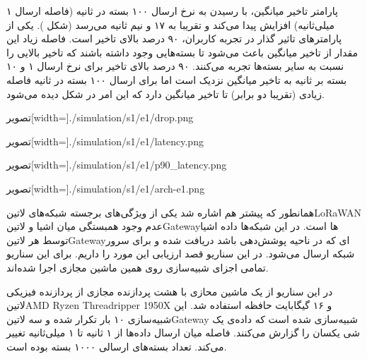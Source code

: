 پارامتر تاخیر میانگین، با رسیدن به نرخ ارسال ۱۰۰ بسته در ثانیه (فاصله ارسال ۱ میلی‌ثانیه) افزایش پیدا می‌کند و
تقریبا به ۱۷ و نیم ثانیه می‌رسد (شکل ).
یکی از پارامترهای تاثیر گذار در تجربه کاربران، ۹۰ درصد بالای تاخیر است.
فاصله زیاد این مقدار از تاخیر میانگین باعث می‌شود تا بسته‌هایی وجود داشته باشند که تاخیر بالایی را نسبت به سایر بسته‌ها تجربه می‌کنند.
۹۰ درصد بالای تاخیر برای نرخ ارسال ۱ و ۱۰ بسته بر ثانیه به تاخیر میانگین نزدیک است اما برای ارسال ۱۰۰ بسته در ثانیه فاصله زیادی (تقریبا دو برابر) تا تاخیر میانگین دارد که این امر
در شکل  دیده می‌شود.

‌تصویر[width=\textwidth]{./simulation/s1/e1/drop.png}

‌تصویر[width=\textwidth]{./simulation/s1/e1/latency.png}

‌تصویر[width=\textwidth]{./simulation/s1/e1/p90_latency.png}

‌تصویر[width=\textwidth]{./simulation/s1/e1/arch-e1.png}


همانطور که پیشتر هم اشاره شد یکی از ویژگی‌های برجسته شبکه‌های ‌لاتین{LoRaWAN} عدم وجود
همبستگی میان اشیا و ‌لاتین{Gateway}ها است. در این شبکه‌ها داده اشیا توسط هر ‌لاتین{Gateway}ای
که در ناحیه پوشش‌دهی باشد دریافت شده و برای سرور شبکه ارسال می‌شود.
در این سناریو قصد ارزیابی این مورد را داریم.
برای این سناریو تمامی اجزای شبیه‌سازی روی همین ماشین مجازی اجرا شده‌اند.

در این سناریو از یک ماشین محازی با هشت پردازنده مجازی از پردازنده فیزیکی
‌لاتین{AMD Ryzen Threadripper 1950X}
و ۱۶ گیگابایت حافظه استفاده شد.
این شبیه‌سازی ۱۰ بار تکرار شده
و سه ‌لاتین{Gateway} شبیه‌سازی شده است که داده‌ی یک شی یکسان را گزارش می‌کنند. فاصله میان ارسال داده‌ها از ۱ ثانیه تا ۱ میلی‌ثانیه تغییر می‌کند.
تعداد بسته‌های ارسالی ۱۰۰۰ بسته بوده است.

